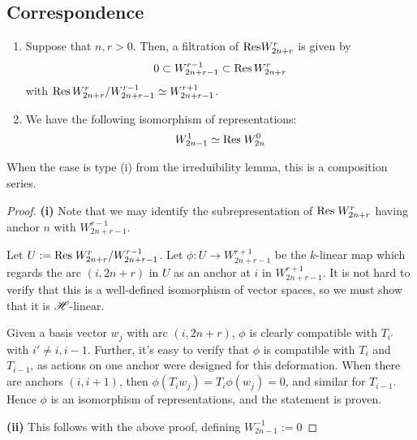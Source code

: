 \documentclass{amsart}
\begin{document}
\subsection{Correspondence}
\begin{proposition}\;
  
  \begin{enumerate}[label={(\roman*)}]
    \item
    Suppose that $n,r > 0$.
    Then, a filtration of $\text{Res} W_{2n + r}^r$ is given by
    \begin{equation}
      0 \subset W_{2n + r - 1}^{r-1} \subset \text{Res} \, W_{2n + r}^r \label{Filtration}
     \end{equation}
     with $\text{Res} \, W_{2n + r}^r / W_{2n + r - 1}^{r-1} \simeq W_{2n + r - 1}^{r + 1}$. 
    \item
      We have the following isomorphism of representations:
      \begin{equation}
        W_{2n - 1}^1 \simeq \text{Res} \; W_{2n}^0 \label{0 Restriction}
       \end{equation}
  \end{enumerate}
    When the case is type (i) from the irreduibility lemma, this is a composition series.
\end{proposition}
\begin{proof}
  \textbf{(i)}
  Note that we may identify the subrepresentation of $\text{Res} \; W_{2n + r}^r$ having anchor $n$ with $W_{2n + r - 1}^{r-1}$.
  
  Let $U := \text{Res} \; W_{2n + r}^r / W_{2n + r - 1}^{r - 1}$. 
  Let $\phi:U \rightarrow W_{2n + r - 1}^{r + 1}$ be the $k$-linear map which regards the arc $(i,2n + r)$ in $U$ as an anchor at $i$ in $W_{2n + r - 1}^{r + 1}$.
  It is not hard to verify that this is a well-defined isomorphism of vector spaces, so we must show that it is $\mathscr{H}$-linear.

  Given a basis vector $w_j$ with arc $(i,2n + r)$, $\phi$ is clearly compatible with $T_{i'}$ with $i' \neq i,i-1$.
  Further, it's easy to verify that $\phi$ is compatible with $T_{i}$ and $T_{i-1}$, as actions on one anchor were designed for this deformation.
  When there are anchors $(i,i+1)$, then $\phi(T_iw_j) = T_i\phi(w_j) = 0$, and similar for $T_{i -1}$.
  Hence $\phi$ is an isomorphism of representations, and the statement is proven.

  \textbf{(ii)}
  This follows with the above proof, defining $W_{2n - 1}^{-1} := 0$
\end{proof}
\end{document}

